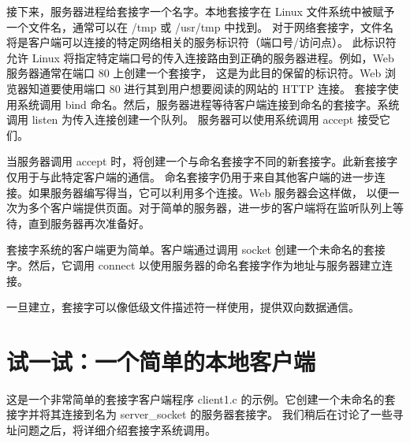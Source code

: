 \documentclass{ctexart}
\begin{document}
接下来，服务器进程给套接字一个名字。本地套接字在 Linux 文件系统中被赋予一个文件名，通常可以在 /tmp 或 /usr/tmp 中找到。
对于网络套接字，文件名将是客户端可以连接的特定网络相关的服务标识符（端口号/访问点）。
此标识符允许 Linux 将指定特定端口号的传入连接路由到正确的服务器进程。例如，Web 服务器通常在端口 80 上创建一个套接字，
这是为此目的保留的标识符。Web 浏览器知道要使用端口 80 进行其到用户想要阅读的网站的 HTTP 连接。
套接字使用系统调用 bind 命名。然后，服务器进程等待客户端连接到命名的套接字。系统调用 listen 为传入连接创建一个队列。
服务器可以使用系统调用 accept 接受它们。  
  
当服务器调用 accept 时，将创建一个与命名套接字不同的新套接字。此新套接字仅用于与此特定客户端的通信。
命名套接字仍用于来自其他客户端的进一步连接。如果服务器编写得当，它可以利用多个连接。Web 服务器会这样做，
以便一次为多个客户端提供页面。对于简单的服务器，进一步的客户端将在监听队列上等待，直到服务器再次准备好。  
  
套接字系统的客户端更为简单。客户端通过调用 socket 创建一个未命名的套接字。然后，它调用 connect 
以使用服务器的命名套接字作为地址与服务器建立连接。  
  
一旦建立，套接字可以像低级文件描述符一样使用，提供双向数据通信。 

\section{试一试：一个简单的本地客户端}  
这是一个非常简单的套接字客户端程序 client1.c 的示例。它创建一个未命名的套接字并将其连接到名为 server\_socket 的服务器套接字。
我们稍后在讨论了一些寻址问题之后，将详细介绍套接字系统调用。  
\end{document}

